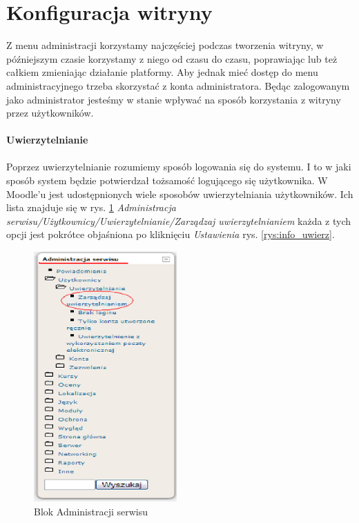 \section{Konfiguracja witryny} \label{roz:konfig}
Z menu administracji korzystamy najczęściej podczas tworzenia witryny, w późniejszym czasie korzystamy z niego od czasu do czasu, poprawiając lub też całkiem zmieniając działanie platformy. Aby jednak mieć dostęp do menu administracyjnego trzeba skorzystać z konta administratora. Będąc zalogowanym jako administrator jesteśmy w stanie wpływać na sposób korzystania z witryny przez użytkowników. \\
\ \\
\textbf{Uwierzytelnianie} \\
\ \\
Poprzez uwierzytelnianie rozumiemy sposób logowania się do systemu. I to w jaki sposób system będzie potwierdzał tożsamość logującego się użytkownika. W Moodle'u jest udostępnionych wiele sposobów uwierzytelniania użytkowników. Ich lista znajduje się w rys. \ref{rys:blok_administracji} \textit{Administracja serwisu/Użytkownicy/Uwierzytelnianie/Zarządzaj uwierzytelnianiem} każda z tych opcji jest pokrótce objaśniona po kliknięciu \textit{Ustawienia} rys. \ref{rys:info_uwierz}.
\begin{figure}[!h]
	\centering
		\caption{Blok Administracji serwisu} \label{rys:blok_administracji}
		\includegraphics[width = 208px]{projekt_sys//rys//admin.eps}
\end{figure}
